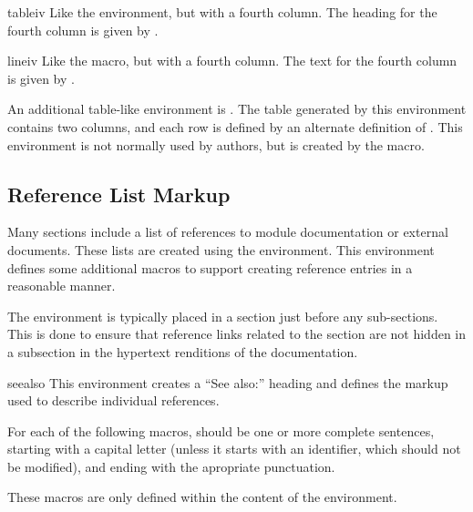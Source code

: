 \documentclass{howto}
\begin{document}
    \begin{envdesc}{tableiv}{}
      Like the  environment, but with a fourth column.
      The heading for the fourth column is given by .
    \end{envdesc}

    \begin{macrodesc}{lineiv}{}
      Like the  macro, but with a fourth column.  The
      text for the fourth column is given by .
    \end{macrodesc}


    An additional table-like environment is .  The
    table generated by this environment contains two columns, and each
    row is defined by an alternate definition of
    .  This environment is not normally used by
    authors, but is created by the  macro.


  \subsection{Reference List Markup \label{references}}

    Many sections include a list of references to module documentation
    or external documents.  These lists are created using the
     environment.  This environment defines some
    additional macros to support creating reference entries in a
    reasonable manner.

    The  environment is typically placed in a section
    just before any sub-sections.  This is done to ensure that
    reference links related to the section are not hidden in a
    subsection in the hypertext renditions of the documentation.

    \begin{envdesc}{seealso}{}
      This environment creates a ``See also:'' heading and defines the
      markup used to describe individual references.
    \end{envdesc}

    For each of the following macros,  should be one or more
    complete sentences, starting with a capital letter (unless it
    starts with an identifier, which should not be modified), and
    ending with the apropriate punctuation.

    These macros are only defined within the content of the
     environment.
\end{document}
